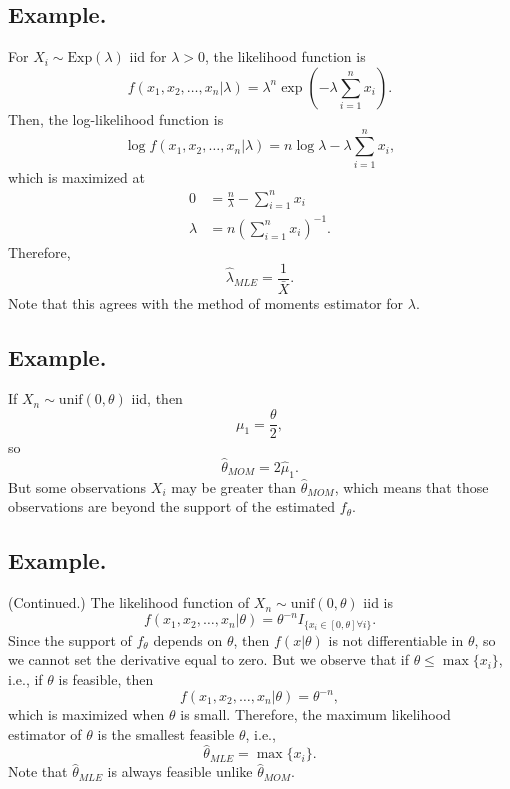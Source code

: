 \documentclass[titlepage]{article}
\begin{document}
\subsection{Example.} For $X_{i} \sim \text{Exp}(\lambda)$ iid for $\lambda > 0$, the likelihood function is 
$$f(x_{1}, x_{2}, \ldots, x_{n}|\lambda) = \lambda^{n}\exp\left(-\lambda\sum_{i=1}^{n}x_{i}\right).$$
Then, the log-likelihood function is 
$$\log f(x_{1}, x_{2}, \ldots, x_{n}|\lambda) = n\log\lambda - \lambda\sum_{i=1}^{n}x_{i},$$
which is maximized at 
\begin{align*}
          0 &= \frac{n}{\lambda} - \sum_{i=1}^{n}x_{i} \\
    \lambda &= n\left(\sum_{i=1}^{n}x_{i}\right)^{-1}.
\end{align*}
Therefore, 
$$\hat{\lambda}_{MLE} = \frac{1}{\bar{X}}.$$
Note that this agrees with the method of moments estimator for $\lambda$.

\subsection{Example.} If $X_{n} \sim \text{unif}(0, \theta)$ iid, then 
$$\mu_{1} = \frac{\theta}{2},$$
so
$$\hat{\theta}_{MOM} = 2\hat{\mu}_{1}.$$
But some observations $X_{i}$ may be greater than $\hat{\theta}_{MOM}$, which means that those observations are beyond the support of the estimated $f_{\theta}$.

\subsection{Example.} (Continued.) The likelihood function of $X_{n} \sim \text{unif}(0, \theta)$ iid is 
$$f(x_{1}, x_{2}, \ldots, x_{n}|\theta) = \theta^{-n}I_{\{x_{i} \in [0, \theta] \forall i\}}.$$
Since the support of $f_{\theta}$ depends on $\theta$, then $f(x|\theta)$ is not differentiable in $\theta$, so we cannot set the derivative equal to zero. But we observe that if $\theta \leq \max\{x_{i}\}$, i.e., if $\theta$ is feasible, then 
$$f(x_{1}, x_{2}, \ldots, x_{n}|\theta) = \theta^{-n},$$
which is maximized when $\theta$ is small. Therefore, the maximum likelihood estimator of $\theta$ is the smallest feasible $\theta$, i.e., 
$$\hat{\theta}_{MLE} = \max\{x_{i}\}.$$
Note that $\hat{\theta}_{MLE}$ is always feasible unlike $\hat{\theta}_{MOM}$.
\end{document}
